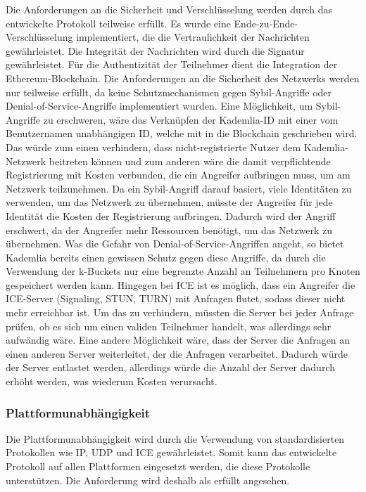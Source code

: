 Die Anforderungen an die Sicherheit und Verschlüsselung werden durch das entwickelte Protokoll teilweise erfüllt. Es wurde eine Ende-zu-Ende-Verschlüsselung implementiert, die die Vertraulichkeit der Nachrichten gewährleistet. Die Integrität der Nachrichten wird durch die Signatur gewährleistet. Für die Authentizität der Teilnehmer dient die Integration der Ethereum-Blockchain. Die Anforderungen an die Sicherheit des Netzwerks werden nur teilweise erfüllt, da keine Schutzmechanismen gegen Sybil-Angriffe oder Denial-of-Service-Angriffe implementiert wurden. Eine Möglichkeit, um Sybil-Angriffe zu erschweren, wäre das Verknüpfen der Kademlia-ID mit einer vom Benutzernamen unabhängigen ID, welche mit in die Blockchain geschrieben wird. Das würde zum einen verhindern, dass nicht-registrierte Nutzer dem Kademlia-Netzwerk beitreten können und zum anderen wäre die damit verpflichtende Registrierung mit Kosten verbunden, die ein Angreifer aufbringen muss, um am Netzwerk teilzunehmen. Da ein Sybil-Angriff darauf basiert, viele Identitäten zu verwenden, um das Netzwerk zu übernehmen, müsste der Angreifer für jede Identität die Kosten der Registrierung aufbringen. Dadurch wird der Angriff erschwert, da der Angreifer mehr Ressourcen benötigt, um das Netzwerk zu übernehmen. Was die Gefahr von Denial-of-Service-Angriffen angeht, so bietet Kademlia bereits einen gewissen Schutz gegen diese Angriffe, da durch die Verwendung der k-Buckets nur eine begrenzte Anzahl an Teilnehmern pro Knoten gespeichert werden kann. Hingegen bei ICE ist es möglich, dass ein Angreifer die ICE-Server (Signaling, STUN, TURN) mit Anfragen flutet, sodass dieser nicht mehr erreichbar ist. Um das zu verhindern, müssten die Server bei jeder Anfrage prüfen, ob es sich um einen validen Teilnehmer handelt, was allerdings sehr aufwändig wäre. Eine andere Möglichkeit wäre, dass der Server die Anfragen an einen anderen Server weiterleitet, der die Anfragen verarbeitet. Dadurch würde der Server entlastet werden, allerdings würde die Anzahl der Server dadurch erhöht werden, was wiederum Kosten verursacht.


\subsubsection{Plattformunabhängigkeit}

Die Plattformunabhängigkeit wird durch die Verwendung von standardisierten Protokollen wie IP, UDP und ICE gewährleistet. Somit kann das entwickelte Protokoll auf allen Plattformen eingesetzt werden, die diese Protokolle unterstützen. Die Anforderung wird deshalb als erfüllt angesehen.


